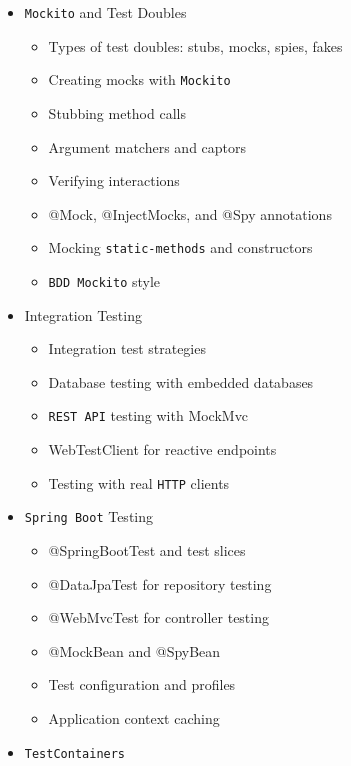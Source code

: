\documentclass[
]{article}
\providecommand{\tightlist}{%
  \setlength{\itemsep}{0pt}\setlength{\parskip}{0pt}}
\begin{document}
\begin{itemize}
  \begin{itemize}
  \tightlist
  \item
    @BeforeEach, @AfterEach, @BeforeAll, @AfterAll
  \item
    Test instance lifecycle modes
  \item
    Extension lifecycle callbacks
  \item
    Temporary directory extension
  \item
    Resource management in tests
  \end{itemize}
\item
  \texttt{Mockito} and Test Doubles

  \begin{itemize}
  \tightlist
  \item
    Types of test doubles: stubs, mocks, spies, fakes
  \item
    Creating mocks with \texttt{Mockito}
  \item
    Stubbing method calls
  \item
    Argument matchers and captors
  \item
    Verifying interactions
  \item
    @Mock, @InjectMocks, and @Spy annotations
  \item
    Mocking \texttt{static-methods} and constructors
  \item
    \texttt{BDD\ Mockito} style
  \end{itemize}
\item
  Integration Testing

  \begin{itemize}
  \tightlist
  \item
    Integration test strategies
  \item
    Database testing with embedded databases
  \item
    \texttt{REST\ API} testing with MockMvc
  \item
    WebTestClient for reactive endpoints
  \item
    Testing with real \texttt{HTTP} clients
  \end{itemize}
\item
  \texttt{Spring\ Boot} Testing

  \begin{itemize}
  \tightlist
  \item
    @SpringBootTest and test slices
  \item
    @DataJpaTest for repository testing
  \item
    @WebMvcTest for controller testing
  \item
    @MockBean and @SpyBean
  \item
    Test configuration and profiles
  \item
    Application context caching
  \end{itemize}
\item
  \texttt{TestContainers}


\end{itemize}
\end{document}
